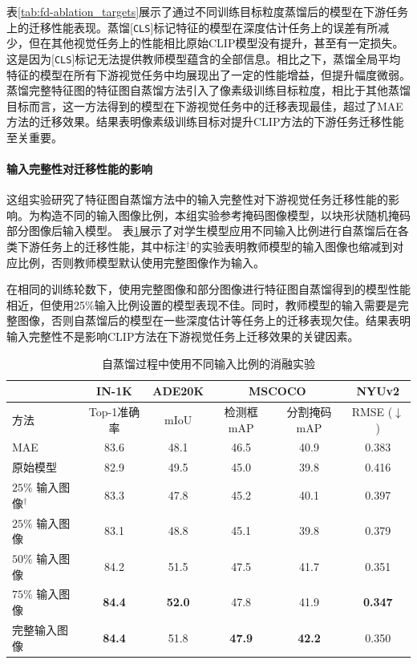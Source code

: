 表\ref{tab:fd-ablation_targets}展示了通过不同训练目标粒度蒸馏后的模型在下游任务上的迁移性能表现。蒸馏[\texttt{CLS}]标记特征的模型在深度估计任务上的误差有所减少，但在其他视觉任务上的性能相比原始CLIP模型没有提升，甚至有一定损失。这是因为[\texttt{CLS}]标记无法提供教师模型蕴含的全部信息。相比之下，蒸馏全局平均特征的模型在所有下游视觉任务中均展现出了一定的性能增益，但提升幅度微弱。蒸馏完整特征图的特征图自蒸馏方法引入了像素级训练目标粒度，相比于其他蒸馏目标而言，这一方法得到的模型在下游视觉任务中的迁移表现最佳，超过了MAE方法的迁移效果。结果表明像素级训练目标对提升CLIP方法的下游任务迁移性能至关重要。

\paragraph{输入完整性对迁移性能的影响} 这组实验研究了特征图自蒸馏方法中的输入完整性对下游视觉任务迁移性能的影响。为构造不同的输入图像比例，本组实验参考掩码图像模型，以块形状随机掩码部分图像后输入模型。%
表\ref{tab:fd-ablation_masking}展示了对学生模型应用不同输入比例进行自蒸馏后在各类下游任务上的迁移性能，其中标注$^{\dag}$的实验表明教师模型的输入图像也缩减到对应比例，否则教师模型默认使用完整图像作为输入。

在相同的训练轮数下，使用完整图像和部分图像进行特征图自蒸馏得到的模型性能相近，但使用25\%输入比例设置的模型表现不佳。同时，教师模型的输入需要是完整图像，否则自蒸馏后的模型在一些深度估计等任务上的迁移表现欠佳。结果表明输入完整性不是影响CLIP方法在下游视觉任务上迁移效果的关键因素。
\begin{table}
\caption{自蒸馏过程中使用不同输入比例的消融实验
}
\centering
  \begin{tabular}{lccccc}
\toprule
   & IN-1K & ADE20K & \multicolumn{2}{c}{MSCOCO} & NYUv2 \\

   \midrule

   方法  &  Top-1准确率   &  mIoU  & 检测框mAP & 分割掩码mAP & RMSE\scriptsize{ ($\downarrow$)}\\
  \midrule

    MAE & 83.6 & 48.1 & 46.5 & 40.9 & 0.383 \\
    原始模型 & 82.9 & 49.5 & 45.0 & 39.8 & 0.416 \\ 
\midrule
  $25\%$ 输入图像$^{\dag}$ & 83.3 & 47.8 & 45.2 & 40.1 & 0.397 \\
  $25\%$ 输入图像 & 83.1 & 48.8 & 45.1& 39.8& 0.379 \\
  $50\%$ 输入图像 & 84.2 & 51.5 & 47.5& 41.7& 0.351 \\
  $75\%$ 输入图像 & \textbf{84.4} & \textbf{52.0} & 47.8& 41.9 & \textbf{0.347} \\
  完整输入图像 & \textbf{84.4} & 51.8 & \textbf{47.9} & \textbf{42.2} & 0.350 \\
\bottomrule
  \end{tabular}
\label{tab:fd-ablation_masking}
\end{table}

